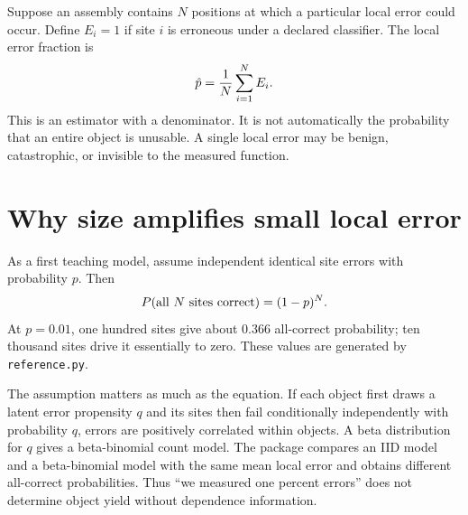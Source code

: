 
Suppose an assembly contains $N$ positions at which a particular local error could
occur. Define $E_i=1$ if site $i$ is erroneous under a declared classifier.
The local error fraction is
\[
\hat p={1\over N}\sum_{i=1}^N E_i.
\]
This is an estimator with a denominator. It is not automatically the probability
that an entire object is unusable. A single local error may be benign, catastrophic,
or invisible to the measured function.

\section{Why size amplifies small local error}

As a first teaching model, assume independent identical site errors with probability
$p$. Then
\begin{equation}
P(\hbox{all $N$ sites correct})=(1-p)^N.
\label{dnad23:iid}
\end{equation}
At $p=0.01$, one hundred sites give about $0.366$ all-correct probability; ten
thousand sites drive it essentially to zero. These values are generated by
\texttt{reference.py}.


The assumption matters as much as the equation. If each object first draws a latent
error propensity $q$ and its sites then fail conditionally independently with
probability $q$, errors are positively correlated within objects. A beta distribution
for $q$ gives a beta-binomial count model. The package compares an IID model and a
beta-binomial model with the same mean local error and obtains different all-correct
probabilities. Thus ``we measured one percent errors'' does not determine object
yield without dependence information.

